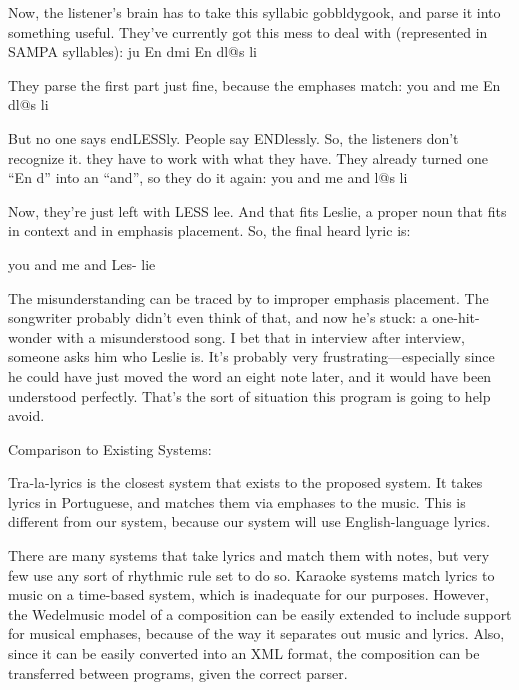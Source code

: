 \documentclass[10pt,oneside]{memoir}
\def\mybibliostyle{plain}
\def\bibliocommand{}
\begin{document}
Now, the listener's brain has to take this syllabic gobbldygook, and parse it into something useful.  They've currently got this mess to deal with (represented in SAMPA syllables):
ju En dmi En dl@s li


They parse the first part just fine, because the emphases match:
you and me En dl@s li


But no one says endLESSly.  People say ENDlessly.  So,  the listeners don't recognize it. they have to work with what they have.  They already turned one ``En d'' into an ``and'', so they do it again:
you and me and l@s li


Now, they're just left with LESS lee.  And that fits Leslie, a proper noun that fits in context and in emphasis placement.  So, the final heard lyric is:


you and me and Les- lie


The misunderstanding can be traced by to improper emphasis placement.  The songwriter probably didn't even think of that, and now he's stuck:  a one-hit-wonder with a misunderstood song.  I bet that in interview after interview, someone asks him who Leslie is.  It's probably very frustrating---especially since he could have just moved the word an eight note later, and it would have been understood perfectly.  That's the sort of situation this program is going to help avoid.


Comparison to Existing Systems:


Tra-la-lyrics is the closest system that exists to the proposed system.  It takes lyrics in Portuguese, and matches them via emphases to the music.  This is different from our system, because our system will use English-language lyrics.


There are many systems that take lyrics and match them with notes, but very few use any sort of rhythmic rule set to do so.  Karaoke systems match lyrics to music on a time-based system, which is inadequate for our purposes.  However, the Wedelmusic model of a composition can be easily extended to include support for musical emphases, because of the way it separates out music and lyrics. Also, since it can be easily converted into an XML format, the composition can be transferred between programs, given the correct parser.


%
%

\backmatter


\bibliocommand

\printglossary


\printindex
\end{document}
